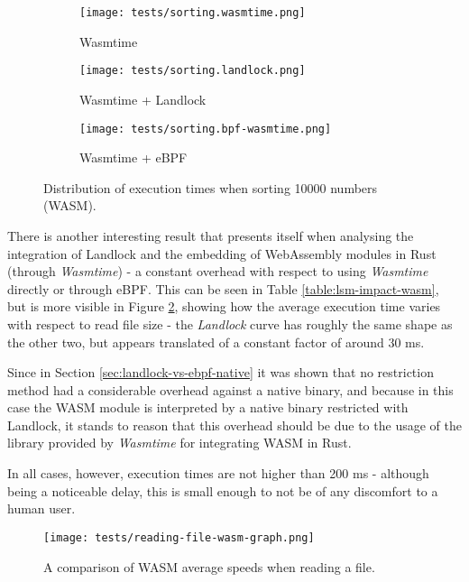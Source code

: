 \begin{figure}[ht!]
  \centering
  \begin{subfigure}[b]{0.32\textwidth}
    \centering
    \texttt{[image: tests/sorting.wasmtime.png]}
    \caption{Wasmtime}
  \end{subfigure}
  \begin{subfigure}[b]{0.32\textwidth}
    \centering
    \texttt{[image: tests/sorting.landlock.png]}
    \caption{Wasmtime + Landlock}
  \end{subfigure}
  \begin{subfigure}[b]{0.32\textwidth}
    \centering
    \texttt{[image: tests/sorting.bpf-wasmtime.png]}
    \caption{Wasmtime + eBPF}
  \end{subfigure}
  \caption{Distribution of execution times when sorting 10000 numbers (WASM).}
  \label{fig:distribution-sorting-wasm}
\end{figure}

There is another interesting result that presents itself when analysing the integration of Landlock
and the embedding of WebAssembly modules in Rust (through \textit{Wasmtime}) -
a constant overhead with respect to using \textit{Wasmtime} directly or through eBPF.
This can be seen in Table \ref{table:lsm-impact-wasm}, but is more visible in Figure \ref{fig:avg-comparison-wasm-speed},
showing how the average execution time varies with respect to read file size -
the \textit{Landlock} curve has roughly the same shape as the other two, but appears translated
of a constant factor of around 30 ms.

Since in Section \ref{sec:landlock-vs-ebpf-native} it was shown that no restriction method had a considerable overhead
against a native binary, and because in this case the WASM module is interpreted by a native binary
restricted with Landlock, it stands to reason that this overhead should be due to the usage
of the library provided by \textit{Wasmtime} for integrating WASM in Rust.

In all cases, however, execution times are not higher than 200 ms - although being a noticeable
delay, this is small enough to not be of any discomfort to a human user.

\begin{figure}[ht!]
  \centering
  \texttt{[image: tests/reading-file-wasm-graph.png]}
  \caption{A comparison of WASM average speeds when reading a file.}
  \label{fig:avg-comparison-wasm-speed}
\end{figure}

